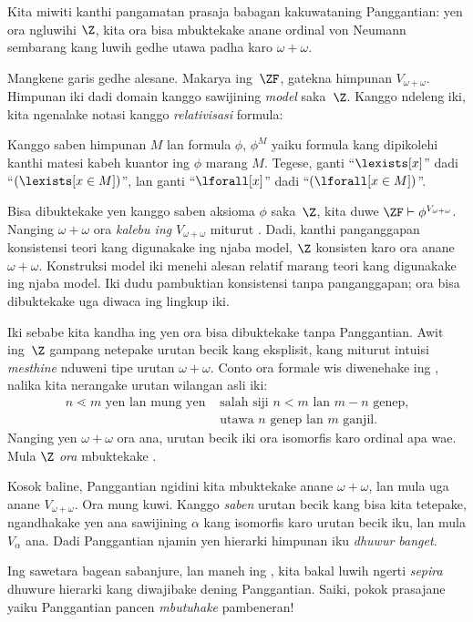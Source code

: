 \documentclass[../../../include/open-logic-section]{subfiles}
\begin{document}

Kita miwiti kanthi pangamatan prasaja babagan
kakuwataning Panggantian: yen ora ngluwihi $\Z$,
kita ora bisa mbuktekake anane ordinal von Neumann
sembarang kang luwih gedhe utawa padha karo
$\omega + \omega$.

Mangkene garis gedhe alesane. Makarya ing~$\ZF$,
gatekna himpunan $V_{\omega+\omega}$. Himpunan
iki dadi domain kanggo sawijining \emph{model}
saka~$\Z$. Kanggo ndeleng iki, kita ngenalake
notasi kanggo \emph{relativisasi} formula:
\begin{defn}
	Kanggo saben himpunan $M$ lan formula $\phi$,
	$\phi^M$ yaiku formula kang dipikolehi kanthi
	matesi kabeh kuantor ing $\phi$ marang $M$.
	Tegese, ganti ``$\lexists[x]$'' dadi
	``$(\lexists[x \in M])$'', lan ganti
	``$\lforall[x]$'' dadi
	``$(\lforall[x \in M])$''.
\end{defn}\noindent
Bisa dibuktekake yen kanggo saben aksioma
$\phi$ saka~$\Z$, kita duwe
$\ZF \vdash \phi^{V_{\omega+\omega}}$.
Nanging $\omega+\omega$ ora \emph{kalebu ing}
$V_{\omega+\omega}$ miturut
. Dadi, kanthi panganggapan konsistensi teori kang digunakake
ing njaba model, $\Z$ konsisten karo ora anane $\omega+\omega$.
Konstruksi model iki menehi alesan relatif marang teori kang digunakake ing njaba model. Iki dudu pambuktian konsistensi tanpa panganggapan; ora bisa dibuktekake uga diwaca ing lingkup iki.

Iki sebabe kita kandha ing
 yen
ora bisa dibuktekake tanpa Panggantian. Awit
ing~$\Z$ gampang netepake urutan becik kang
eksplisit, kang miturut intuisi \emph{mesthine}
nduweni tipe urutan $\omega+\omega$. Conto
ora formale wis diwenehake ing
, nalika kita
nerangake urutan wilangan asli iki:
\begin{align*}
	n \lessdot m \text{ yen lan mung yen }&\text{salah siji }n < m\text{ lan }m-n\text{ genep,}\\
	& \text{utawa $n$ genep lan $m$ ganjil.}
\end{align*}
Nanging yen $\omega+\omega$ ora ana, urutan
becik iki ora isomorfis karo ordinal apa wae.
Mula $\Z$ \emph{ora} mbuktekake
.

Kosok baline, Panggantian ngidini kita
mbuktekake anane $\omega+\omega$, lan mula
uga anane $V_{\omega+\omega}$. Ora mung kuwi.
Kanggo \emph{saben} urutan becik kang bisa
kita tetepake,
ngandhakake yen ana sawijining $\alpha$ kang
isomorfis karo urutan becik iku, lan mula
$V_\alpha$ ana. Dadi Panggantian njamin
yen hierarki himpunan iku \emph{dhuwur banget}.

Ing sawetara bagean sabanjure, lan maneh ing
, kita bakal
luwih ngerti \emph{sepira} dhuwure hierarki
kang diwajibake dening Panggantian. Saiki,
pokok prasajane yaiku Panggantian pancen
\emph{mbutuhake} pambeneran!
\end{document}
